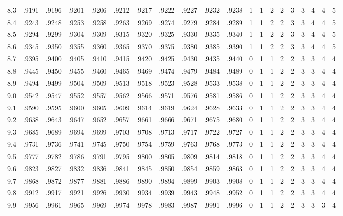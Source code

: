 {\begin{tabular}{|c|cccccccccc|ccccccccc|}
8.3 & .9191 & .9196 & .9201 & .9206 & .9212 & .9217 & .9222 & .9227 & .9232 & .9238 & 1 & 1 & 2 & 2 & 3 & 3 & 4 & 4 & 5 \\
8.4 & .9243 & .9248 & .9253 & .9258 & .9263 & .9269 & .9274 & .9279 & .9284 & .9289 & 1 & 1 & 2 & 2 & 3 & 3 & 4 & 4 & 5 \\
8.5 & .9294 & .9299 & .9304 & .9309 & .9315 & .9320 & .9325 & .9330 & .9335 & .9340 & 1 & 1 & 2 & 2 & 3 & 3 & 4 & 4 & 5 \\
8.6 & .9345 & .9350 & .9355 & .9360 & .9365 & .9370 & .9375 & .9380 & .9385 & .9390 & 1 & 1 & 2 & 2 & 3 & 3 & 4 & 4 & 5 \\
8.7 & .9395 & .9400 & .9405 & .9410 & .9415 & .9420 & .9425 & .9430 & .9435 & .9440 & 0 & 1 & 1 & 2 & 2 & 3 & 3 & 4 & 4 \\
8.8 & .9445 & .9450 & .9455 & .9460 & .9465 & .9469 & .9474 & .9479 & .9484 & .9489 & 0 & 1 & 1 & 2 & 2 & 3 & 3 & 4 & 4 \\
8.9 & .9494 & .9499 & .9504 & .9509 & .9513 & .9518 & .9523 & .9528 & .9533 & .9538 & 0 & 1 & 1 & 2 & 2 & 3 & 3 & 4 & 4 \\
9.0 & .9542 & .9547 & .9552 & .9557 & .9562 & .9566 & .9571 & .9576 & .9581 & .9586 & 0 & 1 & 1 & 2 & 2 & 3 & 3 & 4 & 4 \\
9.1 & .9590 & .9595 & .9600 & .9605 & .9609 & .9614 & .9619 & .9624 & .9628 & .9633 & 0 & 1 & 1 & 2 & 2 & 3 & 3 & 4 & 4 \\
9.2 & .9638 & .9643 & .9647 & .9652 & .9657 & .9661 & .9666 & .9671 & .9675 & .9680 & 0 & 1 & 1 & 2 & 2 & 3 & 3 & 4 & 4 \\
9.3 & .9685 & .9689 & .9694 & .9699 & .9703 & .9708 & .9713 & .9717 & .9722 & .9727 & 0 & 1 & 1 & 2 & 2 & 3 & 3 & 4 & 4 \\
9.4 & .9731 & .9736 & .9741 & .9745 & .9750 & .9754 & .9759 & .9763 & .9768 & .9773 & 0 & 1 & 1 & 2 & 2 & 3 & 3 & 4 & 4 \\
9.5 & .9777 & .9782 & .9786 & .9791 & .9795 & .9800 & .9805 & .9809 & .9814 & .9818 & 0 & 1 & 1 & 2 & 2 & 3 & 3 & 4 & 4 \\
9.6 & .9823 & .9827 & .9832 & .9836 & .9841 & .9845 & .9850 & .9854 & .9859 & .9863 & 0 & 1 & 1 & 2 & 2 & 3 & 3 & 4 & 4 \\
9.7 & .9868 & .9872 & .9877 & .9881 & .9886 & .9890 & .9894 & .9899 & .9903 & .9908 & 0 & 1 & 1 & 2 & 2 & 3 & 3 & 4 & 4 \\
9.8 & .9912 & .9917 & .9921 & .9926 & .9930 & .9934 & .9939 & .9943 & .9948 & .9952 & 0 & 1 & 1 & 2 & 2 & 3 & 3 & 4 & 4 \\
9.9 & .9956 & .9961 & .9965 & .9969 & .9974 & .9978 & .9983 & .9987 & .9991 & .9996 & 0 & 1 & 1 & 2 & 2 & 3 & 3 & 3 & 4 \\
\hline
\end{tabular}\par}
